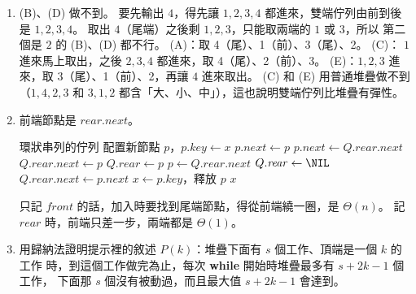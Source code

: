 \begin{enumerate}
必要：若第一個 $d_k < 1$ 出現在某個 $k$。 $d_0 = 0$，$k = 1$ 時第一個記號是運算子，
對空堆疊 pop；$k > 1$ 時 $d_{k-1} \ge 1$、$d_k = d_{k-1} - 1 < 1$，所以
$d_{k-1} = 1$，處理第 $k$ 個運算子時堆疊只有一個數，第二次 pop 下溢。 若所有
$d_k \ge 1$ 但 $d_m \ne 1$，結束時堆疊不是恰好一個數。

判斷：\texttt{a b c - + d} 的 $d$ 依序是 $1, 2, 3, 2, 1, 2$，結尾 $d_m = 2 \ne 1$，
不合法（最後多一個運算元）。 \texttt{a b + - c d} 的 $d$ 依序是 $1, 2, 1, 0, \ldots$，
第 4 個記號 $d = 0$，不合法（$-$ 只有一個運算元可用）。

\item (B)、(D) 做不到。 要先輸出 $4$，得先讓 $1, 2, 3, 4$ 都進來，雙端佇列由前到後
是 $1, 2, 3, 4$。 取出 $4$（尾端）之後剩 $1, 2, 3$，只能取兩端的 $1$ 或 $3$，所以
第二個是 $2$ 的 (B)、(D) 都不行。 (A)：取 4（尾）、1（前）、3（尾）、2。 (C)：
$1$ 進來馬上取出，之後 $2, 3, 4$ 都進來，取 4（尾）、2（前）、3。 (E)：$1, 2, 3$
進來，取 3（尾）、1（前）、2，再讓 $4$ 進來取出。 (C) 和 (E) 用普通堆疊做不到
（$1, 4, 2, 3$ 和 $3, 1, 2$ 都含「大、小、中」），這也說明雙端佇列比堆疊有彈性。

\item 前端節點是 $\mathit{rear}.\mathit{next}$。
\begin{pseudo}[unbreakable]{環狀串列的佇列}
    \State 配置新節點 $p$，$p.\mathit{key} \gets x$
        \State $p.\mathit{next} \gets p$ 
    \Else
        \State $p.\mathit{next} \gets Q.\mathit{rear}.\mathit{next}$ 
        \State $Q.\mathit{rear}.\mathit{next} \gets p$
    \EndIf
    \State $Q.\mathit{rear} \gets p$
\EndProcedure
\Statex
{}
        \State {}
    \EndIf
    \State $p \gets Q.\mathit{rear}.\mathit{next}$ 
        \State $Q.\mathit{rear} \gets \NIL$ 
    \Else
        \State $Q.\mathit{rear}.\mathit{next} \gets p.\mathit{next}$
    \EndIf
    \State $x \gets p.\mathit{key}$，釋放 $p$
    \State \Return $x$
\EndFunction
\end{pseudo}
只記 $\mathit{front}$ 的話，加入時要找到尾端節點，得從前端繞一圈，是
$\Theta(n)$。 記 $\mathit{rear}$ 時，前端只差一步，兩端都是 $\Theta(1)$。

\item 用歸納法證明提示裡的敘述 $P(k)$：堆疊下面有 $s$ 個工作、頂端是一個 $k$ 的工作
時，到這個工作做完為止，每次 \textbf{while} 開始時堆疊最多有 $s + 2k - 1$ 個工作，
下面那 $s$ 個沒有被動過，而且最大值 $s + 2k - 1$ 會達到。


\end{enumerate}
